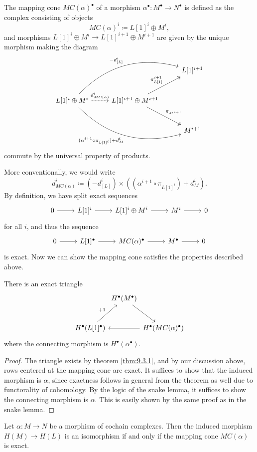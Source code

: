 \begin{definition}\label{dfn:9.4.1}
	The mapping cone $MC(\alpha )^\bullet $ of a morphism $\alpha ^\bullet : M^\bullet  \to N^\bullet $ is defined as the complex consisting of objects
	\[
		MC(\alpha )^i\coloneqq L[1]^i \oplus M^i
	,\]
	and morphisms $L[1]^i\oplus M^i \to L[1]^{i+1} \oplus M^{i+1} $ are given by the unique morphism making the diagram
	\[\begin{tikzcd}[row sep = 2.5em, column sep = 2.5em]
		&&L[1]^{i+1} \\
		L[1]^{i} \oplus M^i\ar[urr, bend left, "-d_{\text{[} L\text{]} } ^i"]\ar[drr, bend right, "(\alpha ^{i+1} \circ \pi_{L\text{[} 1\text{]} ^i} )+d_M^i"']\ar[r, dashed, "d_{MC(\alpha )}^i "]&L[1]^{i+1} \oplus M^{i+1} \ar[ur, two heads, "\pi_{L\text{[} 1\text{]} }^{i+1}  "]\ar[dr, two heads, "\pi_{M^{i+1} } "]\\
																				      &&M^{i+1} 
	\end{tikzcd}\]
	commute by the universal property of products.
\end{definition}

More conventionally, we would write
\[
	d_{MC(\alpha )} ^i\coloneqq \left( -d_{[L]}^i \right) \times \left( \left( \alpha ^{i+1} \circ \pi_{L[1]^i}  \right) +d_M^i \right) 
.\]
By definition, we have split exact sequences
\[\begin{tikzcd}[row sep = 2.5em, column sep = 2.5em]
	0\ar[r]&L[1]^i\ar[r]&L[1]^i\oplus M^i\ar[r]&M^i\ar[r]&0
\end{tikzcd}\]
for all $i$, and thus the sequence
\[\begin{tikzcd}[row sep = 2.5em, column sep = 2.5em]
	0\ar[r]&L[1]^\bullet \ar[r]&MC(\alpha )^\bullet  \ar[r]&M^\bullet \ar[r]&0
\end{tikzcd}\]
is exact. Now we can show the mapping cone satisfies the properties described above.

\begin{proposition}\label{prp:9.4.1}
	There is an exact triangle
	\[\begin{tikzcd}[row sep = 2.5em, column sep = 0em]
		&H^\bullet (M^\bullet )\ar[dr]\\
		H^\bullet (L[1]^\bullet )\ar[ur, "+1"]&&H^\bullet (MC(\alpha )^\bullet )\ar[ll]
	\end{tikzcd}\]
	where the connecting morphism is $H^\bullet (\alpha ^\bullet )$.
\end{proposition}
\begin{proof}
	The triangle exists by theorem \ref{thm:9.3.1}, and by our discussion above, rows centered at the mapping cone are exact. It suffices to show that the induced morphism is $\alpha $, since exactness follows in general from the theorem as well due to functorality of cohomology. By the logic of the snake lemma, it suffices to show the connecting morphism is $\alpha $. This is easily shown by the same proof as in the snake lemma.
\end{proof}
\begin{corollary}\label{cor:9.4.1}
	Let $\alpha : M \to N$ be a morphism of cochain complexes. Then the induced morphism $H(M)\to H\left( L \right) $ is an isomorphism if and only if the mapping cone $MC(\alpha )$ is exact.
\end{corollary}

